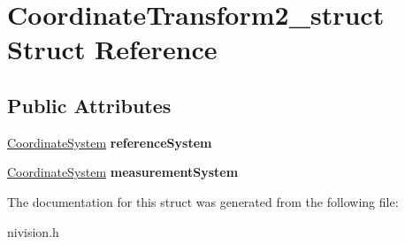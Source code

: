 \hypertarget{structCoordinateTransform2__struct}{\section{\-Coordinate\-Transform2\-\_\-struct \-Struct \-Reference}
\label{structCoordinateTransform2__struct}
}
\subsection*{\-Public \-Attributes}
\begin{DoxyCompactItemize}
\item 
\hypertarget{structCoordinateTransform2__struct_a4c0971022b5b8c188d658a165eee042d}{\hyperlink{structCoordinateSystem__struct}{\-Coordinate\-System} {\bfseries reference\-System}}\label{structCoordinateTransform2__struct_a4c0971022b5b8c188d658a165eee042d}

\item 
\hypertarget{structCoordinateTransform2__struct_abc8201cd65f41a049da32e0a0f7c4072}{\hyperlink{structCoordinateSystem__struct}{\-Coordinate\-System} {\bfseries measurement\-System}}\label{structCoordinateTransform2__struct_abc8201cd65f41a049da32e0a0f7c4072}

\end{DoxyCompactItemize}


\-The documentation for this struct was generated from the following file\-:\begin{DoxyCompactItemize}
\item 
nivision.\-h\end{DoxyCompactItemize}
